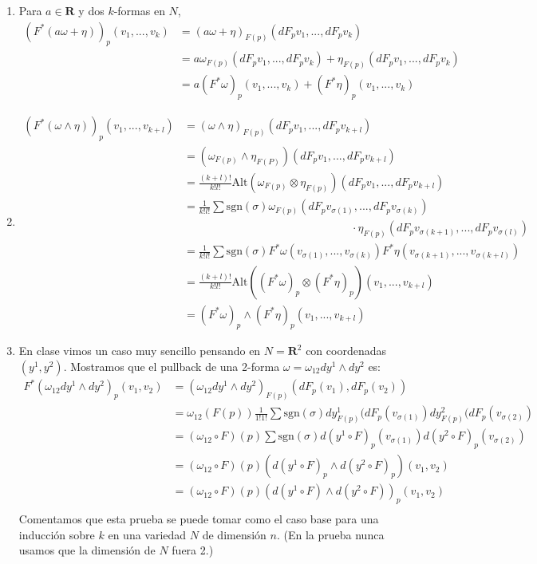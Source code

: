 \documentclass[11pt]{article}
\theoremstyle{definition}
\begin{document}
\begin{enumerate}[label=(\alph*)]
    \item Para $a\in \mathbf{R}$ y dos $k$-formas en $N$,
    \begin{align*}
        (F^*(a\omega+\eta))_p(v_1,...,v_k) &=(a\omega+\eta)_{F(p)}(dF_{p}v_1,...,dF_{p}v_k)\\
        &=a\omega_{F(p)}(dF_{p}v_1,...,dF_{p}v_k)+\eta_{F(p)}(dF_{p}v_1,...,dF_{p}v_k)\\
        &=a(F^*\omega)_p(v_1,...,v_k)+(F^*\eta)_p(v_1,...,v_k)
    \end{align*}
    \item
    \begin{align*}
        (F^*(\omega\wedge \eta))_p(v_1,...,v_{k+l})&=(\omega\wedge \eta)_{F(p)}(dF_{p}v_1,...,dF_{p}v_{k+l})\\
        &=(\omega_{F(p)}\wedge \eta_{F(P)})(dF_{p}v_1,...,dF_{p}v_{k+l})\\
        &=\frac{(k+l)!}{k!l!}\text{Alt}(\omega_{F(p)}\otimes\eta_{F(p)})(dF_{p}v_1,...,dF_{p}v_{k+l})\\
        &=\frac{1}{k!l!}\sum \text{sgn}(\sigma)\omega_{F(p)}(dF_{p}v_{\sigma(1)},...,dF_{p}v_{\sigma(k)})\\ &\quad\quad\quad\quad\quad\quad\quad\quad\quad\quad\quad\quad\quad\quad\quad
        \cdot\eta_{F(p)}(dF_{p}v_{\sigma(k+1)},...,dF_{p}v_{\sigma(l)})\\
        &=\frac{1}{k!l!}\sum \text{sgn}(\sigma)F^*\omega(v_{\sigma(1)},...,v_{\sigma(k)})F^*\eta(v_{\sigma(k+1)},...,v_{\sigma(k+l)})\\
        &= \frac{(k+l)!}{k!l!}\text{Alt}((F^*\omega)_p\otimes(F^*\eta)_p)(v_1,...,v_{k+l})\\
        &= (F^*\omega)_p\wedge (F^*\eta)_p(v_1,...,v_{k+l})
    \end{align*}

    \item En clase vimos un caso muy sencillo pensando en $N=\mathbf{R}^2$ con coordenadas $(y^1,y^2)$. Mostramos que el pullback de una 2-forma $\omega=\omega_{12}dy^1\wedge dy^2$ es:
    \begin{align*}
        F^*(\omega_{12}dy^1\wedge dy^2)_p(v_1,v_2)&=(\omega_{12}dy^1\wedge dy^2)_{F(p)}(dF_{p}(v_1),dF_{p}(v_2))\\
        &=\omega_{12}(F(p))\frac{1}{1!1!}\sum\text{sgn}(\sigma)dy^1_{F(p)}(dF_p(v_{\sigma(1)})dy^2_{F(p)}(dF_p(v_{\sigma(2)})\\
        &=(\omega_{12}\circ F)(p)\sum\text{sgn}(\sigma)d(y^1\circ F)_p(v_{\sigma(1)})d(y^2\circ F)_p(v_{\sigma(2)})\\
        &=(\omega_{12}\circ F)(p)(d(y^1\circ F)_p\wedge d(y^2\circ F)_p)(v_1,v_2)\\
        &=(\omega_{12}\circ F)(p)(d(y^1\circ F)\wedge d(y^2\circ F))_p(v_1,v_2)\\
    \end{align*}
    Comentamos que esta prueba se puede tomar como el caso base para una inducción sobre $k$ en una variedad $N$ de dimensión $n$. (En la prueba nunca usamos que la dimensión de $N$ fuera 2.)
\end{enumerate}
\newpage
\end{document}
